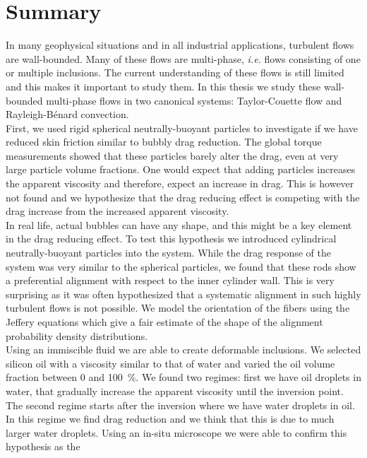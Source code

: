 \chapter{Summary}
In many geophysical situations and in all industrial applications,
turbulent flows are wall-bounded. Many of these flows are multi-phase,
\textit{i.e.} flows consisting of one or multiple inclusions.
The current understanding of these flows is still limited and this makes it
important to study them. 
In this thesis we study these wall-bounded multi-phase flows in two
canonical systems: Taylor-Couette flow and Rayleigh-B\'enard convection.\\
\indent First, we used rigid spherical neutrally-buoyant particles 
to investigate if we have reduced skin friction similar to bubbly drag
reduction.
The global torque measurements showed that these particles
barely alter the drag, even at very large particle volume fractions.
One would expect that adding particles increases the apparent viscosity and
therefore, expect an increase in drag.
This is however not found and we hypothesize that the drag reducing effect is
competing with the drag increase from the increased apparent viscosity.\\
\indent In real life, actual bubbles can have any shape, and this might be a key
element in the drag reducing effect.
To test this hypothesis we introduced cylindrical neutrally-buoyant particles
into the system. 
While the drag response of the system was very similar to the spherical
particles, we found that these rods show a preferential alignment with respect
to the inner cylinder wall.
This is very surprising as it was often hypothesized that a systematic
alignment in such highly turbulent flows is not possible.
We model the orientation of the fibers using the Jeffery equations which give
a fair estimate of the shape of the alignment probability density
distributions.\\
\indent Using an immiscible fluid we are able to create deformable inclusions.
We selected silicon oil with a viscosity similar to that of water and varied
the oil volume fraction between 0 and \SI{100}{\percent}.
We found two regimes: first we have oil droplets in water, that gradually
increase the apparent viscosity until the inversion point.
The second regime starts after the inversion where we have water droplets in
oil.
In this regime we find drag reduction and we think that this is due to much
larger water droplets. 
Using an in-situ microscope we were able to confirm this hypothesis as the
